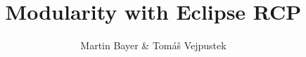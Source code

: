 \documentclass{beamer}
\title{Modularity with Eclipse RCP}
\author{Martin Bayer \& Tom\'{a}\v{s} Vejpustek}
\begin{document}
\titlepageframe
\end{document}
